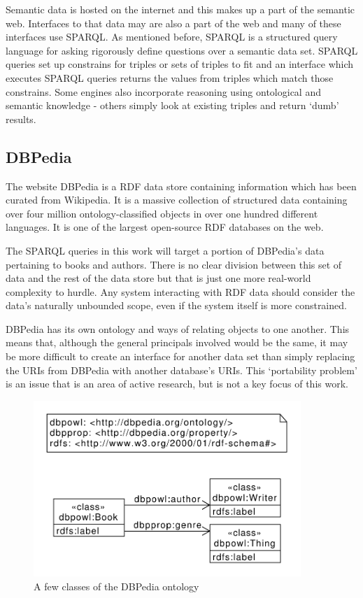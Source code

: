 \documentclass[11pt]{article}
\begin{document}
Semantic data is hosted on the internet and this makes up a part of the semantic web.
Interfaces to that data may are also a part of the web and many of these interfaces
use SPARQL. As mentioned before, SPARQL is a structured query language for asking
rigorously define questions over a semantic data set. SPARQL queries set up constrains
for triples or sets of triples to fit and an interface which executes SPARQL queries
returns the values from triples which match those constrains. Some engines also
incorporate reasoning using ontological and semantic knowledge - others simply look
at existing triples and return `dumb' results.

\subsection{DBPedia}

The website DBPedia\cite{dbpedia,dbpedia-swj} is a RDF data store containing information 
which has been curated from Wikipedia. It is a massive collection of structured data
containing over four million ontology-classified objects in over one hundred different
languages. It is one of the largest open-source RDF databases on the web.

The SPARQL queries in this work will target a portion of DBPedia's
data pertaining to books and authors. There is no clear division between this set of
data and the rest of the data store but that is just one more real-world complexity
to hurdle. Any system interacting with RDF data should consider
the data's naturally unbounded scope, even if the system itself is more constrained.

DBPedia has its own ontology and ways of relating objects to one another. This means
that, although the general principals involved would be the same, 
it may be more difficult to create an interface for another data set than simply 
replacing the URIs from DBPedia with another database's URIs. This `portability problem'
is an issue that is an area of active research\cite{issues, usability}, 
but is not a key focus of this work.

\begin{figure}[h!]
    \centering
    \includegraphics[width=0.9\textwidth,natwidth=1,natheight=1]{umlet/book_ontology.pdf}
    \caption{A few classes of the DBPedia ontology}
    \label{fig:book_ontology}
\end{figure}
\end{document}
